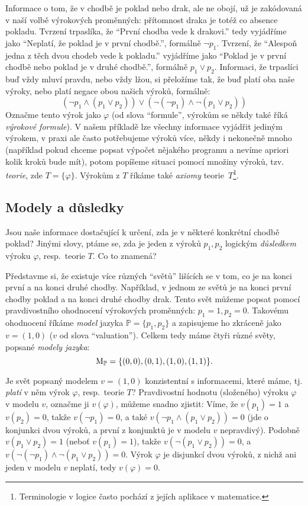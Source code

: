 Informace o tom, že v chodbě je poklad nebo drak, ale ne obojí, už je zakódovaná v naší volbě výrokových proměnných: přítomnost draka je totéž co absence pokladu. Tvrzení trpaslíka, že ``První chodba vede k drakovi.'' tedy vyjádříme jako ``Neplatí, že poklad je v první chodbě.'', formálně \(\neg p_1\). Tvrzení, že ``Alespoň jedna z těch dvou chodeb vede k pokladu.'' vyjádříme jako ``Poklad je v první chodbě nebo poklad je v druhé chodbě.'', formálně \( p_1 \lor p_2\). Informaci, že trpaslíci buď vždy mluví pravdu, nebo vždy lžou, si přeložíme tak, že buď platí oba naše výroky, nebo platí negace obou našich výroků, formálně:
\[
    (\neg p_1 \land (p_1 \lor p_2)) \lor (\neg (\neg p_1) \land \neg (p_1 \lor p_2))
\]
Označme tento výrok jako \( \varphi \) (od slova ``formule'', výrokům se někdy také říká \emph{výrokové formule}). V našem příkladě lze všechny informace vyjádřit jediným výrokem, v praxi ale často potřebujeme výroků více, někdy i nekonečně mnoho (například pokud chceme popsat výpočet nějakého programu a nevíme apriori kolik kroků bude mít), potom popíšeme situaci pomocí množiny výroků, tzv. \emph{teorie}, zde \( T=\{ \varphi \} \). Výrokům z \( T \) říkáme také \emph{axiomy} teorie~\( T \)\footnote{Terminologie v logice často pochází z jejích aplikace v matematice.}.


\subsection{Modely a důsledky}

Jsou naše informace dostačující k určení, zda je v některé konkrétní chodbě poklad? Jinými slovy, ptáme se, zda je jeden z výroků \( p_1, p_2 \) logickým \emph{důsledkem} výroku \( \varphi \), resp.\ teorie \( T \). Co to znamená?

Představme si, že existuje více různých ``světů'' lišících se v tom, co je na konci první a na konci druhé chodby. Například, v jednom ze světů je na konci první chodby poklad a na konci druhé chodby drak. Tento svět můžeme popsat pomocí pravdivostního ohodnocení výrokových proměnných: \( p_1=1, p_2=0 \). Takovému ohodnocení říkáme \emph{model} jazyka \( \mathbb P=\{p_1,p_2\} \) a zapisujeme ho zkráceně jako \( v = (1,0) \) (\(v\) od slova ``valuation''). Celkem tedy máme čtyři různé světy, popsané \emph{modely jazyka}:
\[
    \operatorname{M}_\mathbb P=\{(0,0),(0,1),(1,0),(1,1)\}.
\]

Je svět popsaný modelem \( v = (1,0) \) konzistentní s informacemi, které máme, tj. \emph{platí} v něm výrok \( \varphi \), resp.\ teorie \( T \)? Pravdivostní hodnotu (složeného) výroku \( \varphi \) v modelu \(v\), označme ji \( v(\varphi) \), můžeme snadno zjistit: Víme, že \( v(p_1) = 1 \) a \( v(p_2) = 0 \), takže \( v(\neg p_1) = 0 \), a také \( v(\neg p_1 \land (p_1 \lor p_2))=0 \) (jde o konjunkci dvou výroků, a první z konjunktů je v modelu \( v \) nepravdivý). Podobně \( v(p_1 \lor p_2)=1 \) (neboť \( v(p_1) = 1 \)), takže \( v(\neg(p_1 \lor p_2))=0 \), a \( v(\neg (\neg p_1) \land \neg (p_1 \lor p_2))=0 \). Výrok \( \varphi \) je disjunkcí dvou výroků, z nichž ani jeden v modelu \(v\) neplatí, tedy \( v(\varphi)=0 \).  

